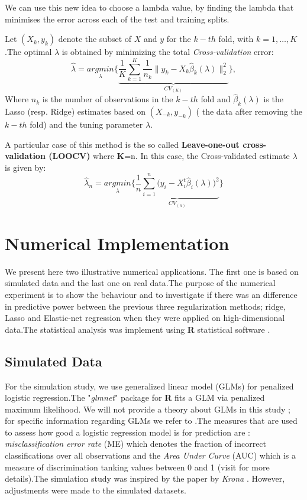 \documentclass[12pt]{report}
\begin{document}
	We can use this new idea to choose a lambda value, by finding the lambda that minimises the error across each of the test and training splits.
	
	Let $(X_{k},y_{k})$ denote the subset of $X$ and $y$ for the $k-th$ fold, with $k=1,\dots, K$.The optimal $\lambda$ is obtained by minimizing the total \textit{Cross-validation} error: 
	\begin{equation}
	\hat{\lambda}=\underset{\lambda}{argmin}\bigg\{\underbrace{\frac{1}{K} \sum_{k=1}^{K}\frac{1}{n_{k}}\parallel y_{k}-X_{k}\hat{\beta}_{k}(\lambda)\parallel_{2}^{2}}_{CV_{(K)}} \bigg\},
	\label{f42}
	\end{equation}
Where $n_{k}$ is the number of observations in the $k-th$ fold and $\hat{\beta}_{k}(\lambda)$ is the Lasso (resp. Ridge) estimates based on $(X_{-k},y_{-k})$ ( the data after removing the $k-th$ fold) and the tuning parameter $\lambda$.
	
	A particular case of this method is the so called \textbf{Leave-one-out cross-validation (LOOCV)} where \textbf{K}=n. In this case, the Cross-validated estimate $\lambda$ is given by:
	\begin{equation}
			\hat{\lambda}_{n}=\underset{\lambda}{argmin}\bigg\{\underbrace{\frac{1}{n} \sum_{i=1}^{n} \big(y_{i}-X_{i}^{t}\hat{\beta}_{i}(\lambda)\big)^{2}}_{CV_{(n)} } \bigg\}
			\label{f43}
	\end{equation}

	\section{Numerical Implementation}
	We present here two illustrative numerical applications. The first one is based on simulated data and the last one on real data.The purpose of the numerical experiment is to show the behaviour and to investigate if there was an difference in predictive power between the previous three regularization methods; ridge, Lasso and Elastic-net regression when they were applied on high-dimensional data.The statistical analysis was implement using \textbf{R} statistical software \cite{nref27}.
	\subsection{Simulated Data}
	For the simulation study, we use generalized linear model (GLMs) for penalized logistic regression.The "\textit{glmnet}" \cite{nref28} package for \textbf{R} fits a GLM via penalized maximum likelihood. We will not provide a theory about GLMs in this study ; for specific information regarding GLMs we refer to \cite{nref29} .The measures that are used to assess how good a logistic regression model is for prediction are : \textit{misclassification error rate }(ME) which denotes the fraction of incorrect classifications over all observations and the \textit{Area Under Curve} (AUC) which is a measure of discrimination tanking values between 0 and 1 (visit \cite{nref29} for more details).The simulation study was inspired by the paper by \textit{Krona } \cite{nref30}. However, adjustments were made to the simulated datasets.
\end{document}
